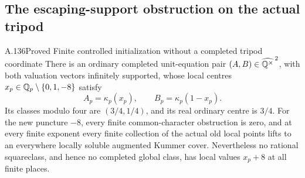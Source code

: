 \subsection{The escaping-support obstruction on the actual tripod}
\begin{statement}{A.136}{Proved}
{Finite controlled initialization without a completed tripod coordinate}
There is an ordinary completed unit-equation pair
\((A,B)\in\widehat{\mathbb Q^\times}^{\,2}\), with both valuation
vectors infinitely supported, whose local centres
\(x_p\in\mathbb Q_p\setminus\{0,1,-8\}\) satisfy
\[
             A_p=\kappa_p(x_p),\qquad
             B_p=\kappa_p(1-x_p).
\tag{A.136.1}
\]
Its classes modulo four are \((3/4,1/4)\), and its real
ordinary centre is \(3/4\).
For the new puncture \(-8\), every finite common-character
obstruction is zero, and at every finite exponent every
finite collection of the actual old local points lifts
to an everywhere locally soluble augmented Kummer cover.
Nevertheless no rational squareclass, and hence no
completed global class, has local values \(x_p+8\) at
all finite places.
\end{statement}
